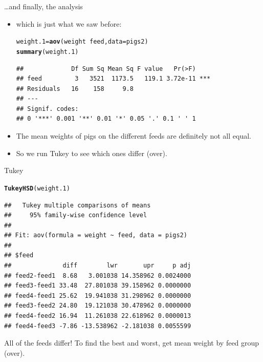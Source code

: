 \documentclass[unknownkeysallowed]{beamer}\usepackage[]{graphicx}\usepackage[]{color}
\makeatletter
\newcommand{\hlopt}[1]{\textcolor[rgb]{0,0,0}{#1}}%
\newcommand{\hlstd}[1]{\textcolor[rgb]{0.345,0.345,0.345}{#1}}%
\newcommand{\hlkwb}[1]{\textcolor[rgb]{0.69,0.353,0.396}{#1}}%
\newcommand{\hlkwc}[1]{\textcolor[rgb]{0.333,0.667,0.333}{#1}}%
\newcommand{\hlkwd}[1]{\textcolor[rgb]{0.737,0.353,0.396}{\textbf{#1}}}%
\newenvironment{kframe}{%
 \def\at@end@of@kframe{}%
 \ifinner\ifhmode%
  \def\at@end@of@kframe{\end{minipage}}%
  \begin{minipage}{\columnwidth}%
 \fi\fi%
 \def\FrameCommand##1{\hskip\@totalleftmargin \hskip-\fboxsep
 \colorbox{shadecolor}{##1}\hskip-\fboxsep
     \hskip-\linewidth \hskip-\@totalleftmargin \hskip\columnwidth}%
 \MakeFramed {\advance\hsize-\width
   \@totalleftmargin\z@ \linewidth\hsize
   \@setminipage}}%
 {\par\unskip\endMakeFramed%
 \at@end@of@kframe}
\newenvironment{knitrout}{}{} %
\makeatother
\begin{document}
\begin{frame}[fragile]{\ldots and finally, the analysis}
  
  \begin{itemize}
  \item which is just what we saw before:
    
\begin{knitrout}\footnotesize
{}\color{fgcolor}\begin{kframe}
\begin{alltt}
\hlstd{weight.1}\hlkwb{=}\hlkwd{aov}\hlstd{(weight}\hlopt{~}\hlstd{feed,}\hlkwc{data}\hlstd{=pigs2)}
\hlkwd{summary}\hlstd{(weight.1)}
\end{alltt}
\begin{verbatim}
##             Df Sum Sq Mean Sq F value   Pr(>F)    
## feed         3   3521  1173.5   119.1 3.72e-11 ***
## Residuals   16    158     9.8                     
## ---
## Signif. codes:  
## 0 '***' 0.001 '**' 0.01 '*' 0.05 '.' 0.1 ' ' 1
\end{verbatim}
\end{kframe}
\end{knitrout}
\item The mean weights of pigs on the different feeds are definitely
  not all equal.
  
\item So we run Tukey to see which ones differ (over).
  \end{itemize}
  
\end{frame}

\begin{frame}[fragile]{Tukey}
  
\begin{knitrout}\small
{}\color{fgcolor}\begin{kframe}
\begin{alltt}
\hlkwd{TukeyHSD}\hlstd{(weight.1)}
\end{alltt}
\begin{verbatim}
##   Tukey multiple comparisons of means
##     95% family-wise confidence level
## 
## Fit: aov(formula = weight ~ feed, data = pigs2)
## 
## $feed
##              diff        lwr       upr     p adj
## feed2-feed1  8.68   3.001038 14.358962 0.0024000
## feed3-feed1 33.48  27.801038 39.158962 0.0000000
## feed4-feed1 25.62  19.941038 31.298962 0.0000000
## feed3-feed2 24.80  19.121038 30.478962 0.0000000
## feed4-feed2 16.94  11.261038 22.618962 0.0000013
## feed4-feed3 -7.86 -13.538962 -2.181038 0.0055599
\end{verbatim}
\end{kframe}
\end{knitrout}

All of the feeds differ! To find the best and worst, get mean weight
by feed group (over).
  
\end{frame}
\end{document}
